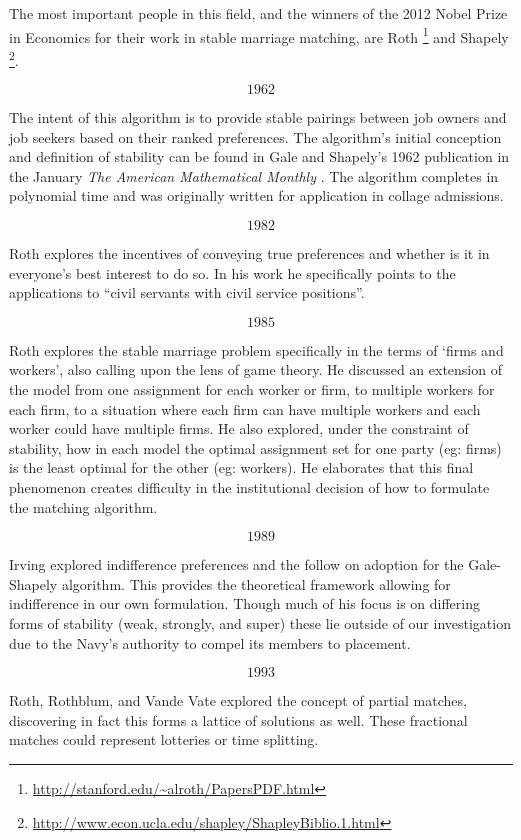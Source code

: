 The most important people in this field, and the winners of the 2012 Nobel Prize in Economics for their work in stable marriage matching, are Roth \footnote{\url{http://stanford.edu/~alroth/PapersPDF.html}} and Shapely \footnote{\url{http://www.econ.ucla.edu/shapley/ShapleyBiblio.1.html}}.

\[1962\]

The intent of this algorithm is to provide stable pairings between job owners and job seekers based on their ranked preferences. The algorithm's initial conception and definition of stability can be found in Gale and Shapely's 1962 publication in the January \textit{The American Mathematical Monthly} \cite{gale_shapely}. The algorithm completes in polynomial time and was originally written for application in collage admissions.

\[1982\]

Roth explores the incentives of conveying true preferences and whether is it in everyone's best interest to do so. \cite{incentives} In his work he specifically points to the applications to ``civil servants with civil service positions''.

\[1985\]

Roth explores the stable marriage problem specifically in the terms of `firms and workers', also calling upon the lens of game theory.\cite{game} He discussed an extension of the model from one assignment for each worker or firm, to multiple workers for each firm, to a situation where each firm can have multiple workers and each worker could have multiple firms. He also explored, under the constraint of stability, how in each model the optimal assignment set for one party (eg: firms) is the least optimal for the other (eg: workers). He elaborates that this final phenomenon creates difficulty in the institutional decision of how to formulate the matching algorithm.

\[1989\]

Irving explored indifference preferences and the follow on adoption for the Gale-Shapely algorithm. \cite{indifference} This provides the theoretical framework allowing for indifference in our own formulation. Though much of his focus is on differing forms of stability (weak, strongly, and super) these lie outside of our investigation due to the Navy's authority to compel its members to placement.

\[1993\]

Roth, Rothblum, and Vande Vate explored the concept of partial matches, discovering in fact this forms a lattice of solutions as well. These fractional matches could represent lotteries or time splitting. \cite{partial}
